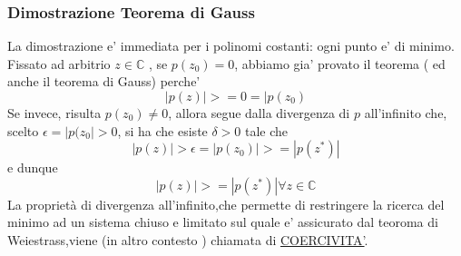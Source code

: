 \documentclass[fontsize = 20px, paper = a4]{article}
\begin{document}
\subsubsection{Dimostrazione Teorema di Gauss}
La dimostrazione e' immediata per i polinomi costanti: ogni punto e' di minimo.\\
Fissato ad arbitrio $ z \in \mathbb{C}$ , se $p(z_{0}) = 0$, abbiamo gia' provato il teorema ( ed anche il teorema di Gauss) perche' 
$$|p(z)| >= 0 = |p(z_{0})$$
Se invece, risulta $p(z_{0}) \neq 0$, allora segue dalla divergenza di $p$ all'infinito che, scelto $\epsilon = |p(z_{0}| > 0$, si ha che esiste $\delta > 0$ tale che 
$$ |p(z)| >\epsilon = |p(z_{0})| >= |p(z^*)|$$
e dunque 
$$|p(z)| >= |p(z^*)| \forall z \in \mathbb{C}$$
La proprietà di divergenza all'infinito,che permette di restringere la ricerca del minimo ad un sistema chiuso e limitato sul quale e' assicurato dal teoroma di Weiestrass,viene (in altro contesto ) chiamata di \underline{COERCIVITA'}.
\end{document}
